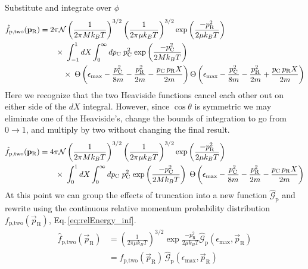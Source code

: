 Substitute and integrate over $\phi$
\begin{equation}
\begin{split}
	 \hat{f}_\text{p,two}(\mathbf{p}_{\text{R}}) &= 2 \pi \mathcal{N} \left(\frac{1}{2 \pi M k_B T}\right)^{3/2} \left(\frac{1}{2 \pi \mu k_B T}\right)^{3/2} \text{exp}\left( {\frac{-p_\text{R}^2}{2 \mu k_B T}} \right) \\
	 &\quad\quad \times \; \int_{-1}^1 dX \int_0^{\infty} dp_\text{C} \; p_\text{C}^2 \; \text{exp}\left( {\frac{-p_\text{C}^2}{2 M k_B T}} \right) \\ 
	 &\quad\quad\quad \times \; \Theta \left( {\epsilon_\text{max} - \frac{p_\text{C}^2}{8m} - \frac{p_\text{R}^2}{2m} - \frac{p_\text{C} \, p_\text{R} X}{2m}} \right) \Theta \left( {\epsilon_\text{max} - \frac{p_\text{C}^2}{8m} - \frac{p_\text{R}^2}{2m} + \frac{p_\text{C} \, p_\text{R} X}{2m}} \right) 
\end{split}
\end{equation}
Here we recognize that the two Heaviside functions cancel each other out on either side of the $dX$ integral.
However, since $\cos\theta$ is symmetric we may eliminate one of the Heaviside's, change the bounds of integration to go from $0 \rightarrow 1$, and multiply by two without changing the final result.
\begin{equation}
\begin{split}
	 \hat{f}_\text{p,two}(\mathbf{p}_{\text{R}}) &= 4 \pi \mathcal{N} \left(\frac{1}{2 \pi M k_B T}\right)^{3/2} \left(\frac{1}{2 \pi \mu k_B T}\right)^{3/2} \text{exp}\left( {\frac{-p_\text{R}^2}{2 \mu k_B T}} \right) \\
	 &\quad\quad \times \; \int_{0}^1 dX \int_0^{\infty} dp_\text{C} \; p_\text{C}^2 \; \text{exp}\left( {\frac{-p_\text{C}^2}{2 M k_B T}} \right) \; \Theta \left( {\epsilon_\text{max} - \frac{p_\text{C}^2}{8m} - \frac{p_\text{R}^2}{2m} - \frac{p_\text{C} \, p_\text{R} X}{2m}} \right)
\end{split}
\end{equation}
At this point we can group the effects of truncation into a new function $\hat{\mathcal{G}}_\text{p}$ and rewrite using the continuous relative momentum probability distribution $f_\text{p,two}(\vec{p}_\text{R})$, Eq.\,\ref{eq:relEnergy_inf}.
\begin{equation}
\begin{split}
	 \hat{f}_\text{p,two}(\vec{p}_{\text{R}}) &= \left(\frac{1}{2 \pi \mu k_B T}\right)^{3/2} \exp{\frac{-p_\text{R}^2}{2 \mu k_B T}} \hat{\mathcal{G}}_\text{p}(\epsilon_\text{max}, \vec{p}_\text{R}) \\
	 &= f_\text{p,two}(\vec{p}_\text{R}) \, \hat{\mathcal{G}}_\text{p}(\epsilon_\text{max}, \vec{p}_\text{R})
\end{split}
\end{equation}

